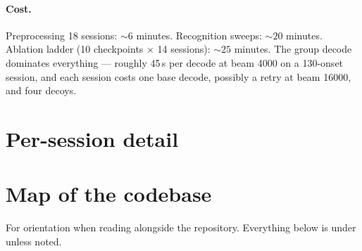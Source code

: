 \paragraph{Cost.} Preprocessing 18 sessions: ${\sim}6$ minutes.
Recognition sweeps: ${\sim}20$ minutes. Ablation ladder (10 checkpoints
$\times$ 14 sessions): ${\sim}25$ minutes. The group decode dominates
everything --- roughly 45\,s per decode at beam 4000 on a 130-onset session,
and each session costs one base decode, possibly a retry at beam 16000, and
four decoys.

\section{Per-session detail}
\label{app:persession}

\begin{table}[h]
\centering\small
\caption{Every held-out session, seed 0, raw CTC with prefix-beam decoding.}
\label{tab:persession}

\end{table}

\section{Map of the codebase}
\label{app:code}

For orientation when reading alongside the repository. Everything below is
under  unless noted.

